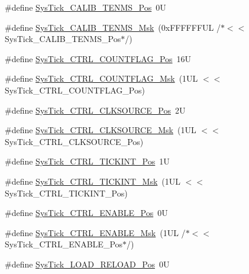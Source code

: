 \begin{DoxyCompactItemize}
\item 
\#define \hyperlink{group___c_m_s_i_s___sys_tick_gacae558f6e75a0bed5d826f606d8e695e}{Sys\+Tick\+\_\+\+C\+A\+L\+I\+B\+\_\+\+T\+E\+N\+M\+S\+\_\+\+Pos}~0U
\item 
\#define \hyperlink{group___c_m_s_i_s___sys_tick_gaf1e68865c5aece2ad58971225bd3e95e}{Sys\+Tick\+\_\+\+C\+A\+L\+I\+B\+\_\+\+T\+E\+N\+M\+S\+\_\+\+Msk}~(0x\+F\+F\+F\+F\+F\+F\+U\+L /$\ast$$<$$<$ Sys\+Tick\+\_\+\+C\+A\+L\+I\+B\+\_\+\+T\+E\+N\+M\+S\+\_\+\+Pos$\ast$/)
\item 
\#define \hyperlink{group___c_m_s_i_s___sys_tick_gadbb65d4a815759649db41df216ed4d60}{Sys\+Tick\+\_\+\+C\+T\+R\+L\+\_\+\+C\+O\+U\+N\+T\+F\+L\+A\+G\+\_\+\+Pos}~16U
\item 
\#define \hyperlink{group___c_m_s_i_s___sys_tick_ga1bf3033ecccf200f59baefe15dbb367c}{Sys\+Tick\+\_\+\+C\+T\+R\+L\+\_\+\+C\+O\+U\+N\+T\+F\+L\+A\+G\+\_\+\+Msk}~(1\+U\+L $<$$<$ Sys\+Tick\+\_\+\+C\+T\+R\+L\+\_\+\+C\+O\+U\+N\+T\+F\+L\+A\+G\+\_\+\+Pos)
\item 
\#define \hyperlink{group___c_m_s_i_s___sys_tick_ga24fbc69a5f0b78d67fda2300257baff1}{Sys\+Tick\+\_\+\+C\+T\+R\+L\+\_\+\+C\+L\+K\+S\+O\+U\+R\+C\+E\+\_\+\+Pos}~2U
\item 
\#define \hyperlink{group___c_m_s_i_s___sys_tick_gaa41d06039797423a46596bd313d57373}{Sys\+Tick\+\_\+\+C\+T\+R\+L\+\_\+\+C\+L\+K\+S\+O\+U\+R\+C\+E\+\_\+\+Msk}~(1\+U\+L $<$$<$ Sys\+Tick\+\_\+\+C\+T\+R\+L\+\_\+\+C\+L\+K\+S\+O\+U\+R\+C\+E\+\_\+\+Pos)
\item 
\#define \hyperlink{group___c_m_s_i_s___sys_tick_ga88f45bbb89ce8df3cd2b2613c7b48214}{Sys\+Tick\+\_\+\+C\+T\+R\+L\+\_\+\+T\+I\+C\+K\+I\+N\+T\+\_\+\+Pos}~1U
\item 
\#define \hyperlink{group___c_m_s_i_s___sys_tick_ga95bb984266ca764024836a870238a027}{Sys\+Tick\+\_\+\+C\+T\+R\+L\+\_\+\+T\+I\+C\+K\+I\+N\+T\+\_\+\+Msk}~(1\+U\+L $<$$<$ Sys\+Tick\+\_\+\+C\+T\+R\+L\+\_\+\+T\+I\+C\+K\+I\+N\+T\+\_\+\+Pos)
\item 
\#define \hyperlink{group___c_m_s_i_s___sys_tick_ga0b48cc1e36d92a92e4bf632890314810}{Sys\+Tick\+\_\+\+C\+T\+R\+L\+\_\+\+E\+N\+A\+B\+L\+E\+\_\+\+Pos}~0U
\item 
\#define \hyperlink{group___c_m_s_i_s___sys_tick_ga16c9fee0ed0235524bdeb38af328fd1f}{Sys\+Tick\+\_\+\+C\+T\+R\+L\+\_\+\+E\+N\+A\+B\+L\+E\+\_\+\+Msk}~(1\+U\+L /$\ast$$<$$<$ Sys\+Tick\+\_\+\+C\+T\+R\+L\+\_\+\+E\+N\+A\+B\+L\+E\+\_\+\+Pos$\ast$/)
\item 
\#define \hyperlink{group___c_m_s_i_s___sys_tick_gaf44d10df359dc5bf5752b0894ae3bad2}{Sys\+Tick\+\_\+\+L\+O\+A\+D\+\_\+\+R\+E\+L\+O\+A\+D\+\_\+\+Pos}~0U
$$
\end{DoxyCompactItemize}
